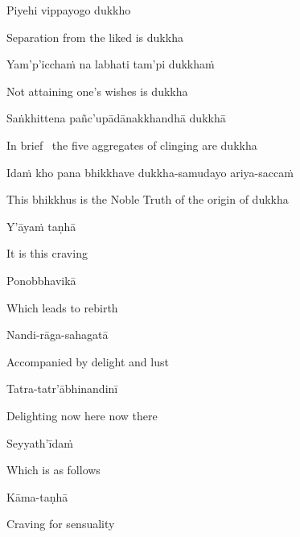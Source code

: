 Piyehi vippayogo dukkho

\begin{english}
  Separation from the liked is dukkha
\end{english}

Yam'p'icchaṁ na labhati tam'pi dukkhaṁ

\begin{english}
  Not attaining one's wishes is dukkha
\end{english}

Saṅkhittena pañc'upādānakkhandhā dukkhā

\begin{english}
  In brief \breathmark\ the five aggregates of clinging are dukkha\makeatletter\hyperlink{endnote54-appendix}\makeatother
\end{english}

Idaṁ kho pana bhikkhave dukkha-samudayo ariya-saccaṁ

\begin{english}
  This bhikkhus is the Noble Truth of the origin of dukkha
\end{english}

Y'āyaṁ taṇhā

\begin{english}
  It is this craving
\end{english}

Ponobbhavikā

\begin{english}
  Which leads to rebirth
\end{english}

Nandi-rāga-sahagatā

\begin{english}
  Accompanied by delight and lust
\end{english}

Tatra-tatr'ābhinandinī

\begin{english}
  Delighting now here now there
\end{english}

Seyyath'īdaṁ

\begin{english}
  Which is as follows
\end{english}

Kāma-taṇhā

\begin{english}
  Craving for sensuality
\end{english}

